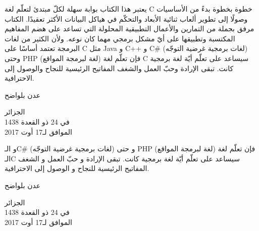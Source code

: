 يعتبر هذا الكتاب بوابة سهلة لكلّ مبتدئ لتعلّم لغة \textenglish{C}
خطوة بخطوة بدءً من الأساسيات وصولًا إلى تطوير ألعاب ثنائية الأبعاد والتحكّم في هياكل البيانات الأكثر تعقيدًا. الكتاب مرفق بجملة من التمارين والأعمال التطبيقية المحلولة التي تساعد على هضم المفاهيم المكتسبة وتطبيقها على أيّ مشكل برمجي مهما كان نوعه. ولأن الكثير من لغات البرمجة تعتمد أساسًا على \textenglish{C}
مثل \textenglish{Java}
و \textenglish{C++}
و \textenglish{C\#}
(لغات برمجية غرضية التوجّه) وحتى
\textenglish{PHP}
(لغة لبرمجة المواقع) فإن تعلّم لغة \textenglish{C}
 سيساعد على تعلّم أيّة لغة برمجية كانت. تبقى الإرادة وحبّ العمل والشغف المفاتيح الرئيسية للنجاح والوصول إلى الاحترافية.

\vfill

\hfill\parbox{0.3\textwidth}{\centering
عدن بلواضح

\vspace{1em}
الجزائر\\[0.5em]
في
24 ذو القعدة 1438\\[0.3em]
الموافق لـ17 أوت 2017

}


و الـ\textenglish{C\#}
(لغات برمجية غرضية التوجّه) و حتى
\textenglish{PHP}
(لغة لبرمجة المواقع) فإن تعلّم لغة الـ\textenglish{C}
 سيساعد على تعلّم أيّة لغة برمجية كانت. تبقى الإرادة و حبّ العمل و الشغف المفاتيح الرئيسية للنجاح و الوصول إلى الاحترافية.

\vfill

\hfill\parbox{0.3\textwidth}{\centering
عدن بلواضح

\vspace{1em}
الجزائر\\[0.5em]
في
24 ذو القعدة 1438\\[0.3em]
الموافق لـ17 أوت 2017

}


